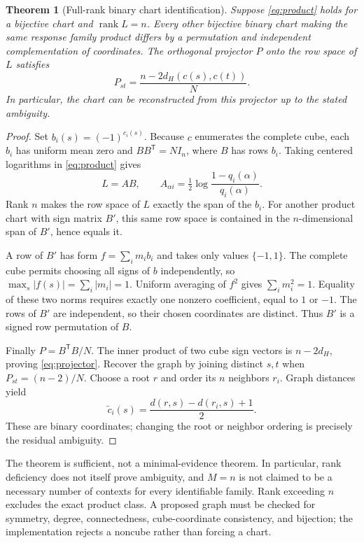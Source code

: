 \documentclass[11pt]{article}
\newtheorem{theorem}{Theorem}
\theoremstyle{definition}\newtheorem{definition}[theorem]{Definition}
\theoremstyle{remark}\newtheorem{remark}[theorem]{Remark}
\newcommand{\rank}{\operatorname{rank}}
\begin{document}
\begin{theorem}[Full-rank binary chart identification]\label{thm:identify}
Suppose \eqref{eq:product} holds for a bijective chart and $\rank L=n$. Every other bijective binary chart making the same response family product differs by a permutation and independent complementation of coordinates. The orthogonal projector $P$ onto the row space of $L$ satisfies
\begin{equation}
P_{st}=\frac{n-2d_H(c(s),c(t))}{N}.\label{eq:projector}
\end{equation}
In particular, the chart can be reconstructed from this projector up to the stated ambiguity.
\end{theorem}
\begin{proof}
Set $b_i(s)=(-1)^{c_i(s)}$. Because $c$ enumerates the complete cube, each $b_i$ has uniform mean zero and $BB^{\mathsf T}=NI_n$, where $B$ has rows $b_i$. Taking centered logarithms in \eqref{eq:product} gives
\begin{equation}
L=AB,\qquad A_{\alpha i}=\tfrac12\log\frac{1-q_i(\alpha)}{q_i(\alpha)}.
\end{equation}
Rank $n$ makes the row space of $L$ exactly the span of the $b_i$. For another product chart with sign matrix $B'$, this same row space is contained in the $n$-dimensional span of $B'$, hence equals it.

A row of $B'$ has form $f=\sum_i m_i b_i$ and takes only values $\{-1,1\}$. The complete cube permits choosing all signs of $b$ independently, so $\max_s|f(s)|=\sum_i|m_i|=1$. Uniform averaging of $f^2$ gives $\sum_i m_i^2=1$. Equality of these two norms requires exactly one nonzero coefficient, equal to $1$ or $-1$. The rows of $B'$ are independent, so their chosen coordinates are distinct. Thus $B'$ is a signed row permutation of $B$.

Finally $P=B^{\mathsf T}B/N$. The inner product of two cube sign vectors is $n-2d_H$, proving \eqref{eq:projector}. Recover the graph by joining distinct $s,t$ when $P_{st}=(n-2)/N$. Choose a root $r$ and order its $n$ neighbors $r_i$. Graph distances yield
\begin{equation}
\widetilde c_i(s)=\frac{d(r,s)-d(r_i,s)+1}{2}.
\end{equation}
These are binary coordinates; changing the root or neighbor ordering is precisely the residual ambiguity.
\end{proof}

The theorem is sufficient, not a minimal-evidence theorem. In particular, rank deficiency does not itself prove ambiguity, and $M=n$ is not claimed to be a necessary number of contexts for every identifiable family. Rank exceeding $n$ excludes the exact product class. A proposed graph must be checked for symmetry, degree, connectedness, cube-coordinate consistency, and bijection; the implementation rejects a noncube rather than forcing a chart.
\end{document}
